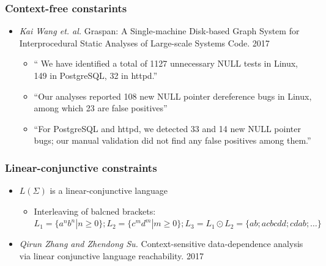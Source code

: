 \documentclass[xcolor=table,aspectratio=169]{beamer}
\begin{document}
\begin{frame}
  \transwipe[direction=90]
  \frametitle{Context-free constarints}

\begin{itemize} 
\item \emph{Kai Wang et. al.} Graspan: A Single-machine Disk-based Graph System for Interprocedural 
Static Analyses of Large-scale Systems Code. 2017
  
\begin{itemize} 
   \item `` We have identified a total of 1127 unnecessary NULL tests in Linux, 149 in PostgreSQL, 
   32 in httpd.''
   \item ``Our analyses reported 108 new NULL pointer dereference bugs in Linux, among which 23 are false positives''
   \item ``For PostgreSQL and httpd, we detected 33 and 14 new NULL pointer bugs; our manual 
   validation did not find any false positives among them.''
\end{itemize}

\end{itemize}

\end{frame}

\begin{frame}
  \transwipe[direction=90]
  \frametitle{Linear-conjunctive constraints}

\begin{itemize} 
  \item $L(\Sigma)$ is a linear-conjunctive language
    \begin{itemize} 
      \item Interleaving of balcned brackets: $L_1 = \{a^n b^n | n \geq 0\}; L_2 = \{c^m d^m | m \geq 0\}; L_3 = L_1 \odot L_2 = \{a b; a c b c d d; c d a b;  \dots\}$
    \end{itemize}

  \item \emph{Qirun Zhang and Zhendong Su.} Context-sensitive data-dependence analysis via linear conjunctive language reachability. 2017
  
\end{itemize}

\end{frame}
\end{document}
